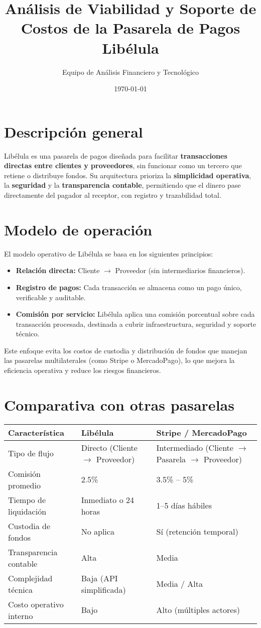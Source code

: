 \documentclass[12pt,a4paper]{article}
\title{\textbf{Análisis de Viabilidad y Soporte de Costos de la Pasarela de Pagos Libélula}}
\author{Equipo de Análisis Financiero y Tecnológico}
\date{\today}
\begin{document}
	
	\section*{Descripción general}
	\noindent
	Libélula es una pasarela de pagos diseñada para facilitar \textbf{transacciones directas entre clientes y proveedores}, sin funcionar como un tercero que retiene o distribuye fondos. Su arquitectura prioriza la \textbf{simplicidad operativa}, la \textbf{seguridad} y la \textbf{transparencia contable}, permitiendo que el dinero pase directamente del pagador al receptor, con registro y trazabilidad total.
	
	\section*{Modelo de operación}
	\noindent
	El modelo operativo de Libélula se basa en los siguientes principios:
	\begin{itemize}
		\item \textbf{Relación directa:} Cliente $\rightarrow$ Proveedor (sin intermediarios financieros).
		\item \textbf{Registro de pagos:} Cada transacción se almacena como un pago único, verificable y auditable.
		\item \textbf{Comisión por servicio:} Libélula aplica una comisión porcentual sobre cada transacción procesada, destinada a cubrir infraestructura, seguridad y soporte técnico.
	\end{itemize}
	
	Este enfoque evita los costos de custodia y distribución de fondos que manejan las pasarelas multilaterales (como Stripe o MercadoPago), lo que mejora la eficiencia operativa y reduce los riesgos financieros.

	\section*{Comparativa con otras pasarelas}
	
	\begin{center}
		\begin{tabular}{>{\raggedright}p{4cm} p{5cm} p{5cm}}
			\toprule
			\textbf{Característica} & \textbf{Libélula} & \textbf{Stripe / MercadoPago} \\
			\midrule
			Tipo de flujo & Directo (Cliente $\rightarrow$ Proveedor) & Intermediado (Cliente $\rightarrow$ Pasarela $\rightarrow$ Proveedor) \\
			Comisión promedio & 2.5\% & 3.5\% -- 5\% \\
			Tiempo de liquidación & Inmediato o 24 horas & 1--5 días hábiles \\
			Custodia de fondos & No aplica & Sí (retención temporal) \\
			Transparencia contable & Alta & Media \\
			Complejidad técnica & Baja (API simplificada) & Media / Alta \\
			Costo operativo interno & Bajo & Alto (múltiples actores) \\
			\bottomrule
		\end{tabular}
	\end{center}
	
\end{document}
